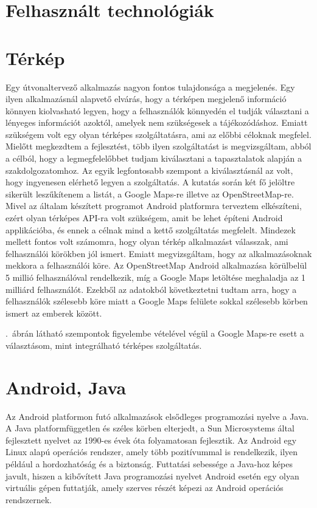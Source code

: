 	

\section{Felhasznált technológiák}
\label{felhaszntech}
\section*{Térkép}
Egy útvonaltervező alkalmazás nagyon fontos tulajdonsága a megjelenés. 
Egy ilyen alkalmazásnál alapvető elvárás, hogy a térképen megjelenő információ könnyen kiolvasható legyen, hogy a felhasználók könnyedén el tudják választani a lényeges információt azoktól, amelyek nem szükségesek a tájékozódáshoz. 
Emiatt szükségem volt egy olyan térképes szolgáltatásra, ami az előbbi céloknak megfelel. 
Mielőtt megkezdtem a fejlesztést, több ilyen szolgáltatást is megvizsgáltam, abból a célból, hogy a legmegfelelőbbet tudjam kiválasztani a tapasztalatok alapján a szakdolgozatomhoz. 
Az egyik legfontosabb szempont a kiválasztásnál az volt, hogy ingyenesen elérhető legyen a szolgáltatás. 
A kutatás során két fő jelöltre sikerült leszűkítenem a listát, a Google Maps-re illetve az OpenStreetMap-re. 
Mivel az általam készített programot Android platformra terveztem elkészíteni, ezért olyan térképes API-ra volt szükségem, amit be lehet építeni Android applikációba, és ennek a célnak mind a kettő szolgáltatás megfelelt. 
Mindezek mellett fontos volt számomra, hogy olyan térkép alkalmazást válasszak, ami felhasználói körökben jól ismert. 
Emiatt megvizsgáltam, hogy az alkalmazásoknak mekkora a felhasználói köre. 
Az OpenStreetMap Android alkalmazása körülbelül 5 millió  felhasználóval rendelkezik, míg a Google Maps letöltése meghaladja az 1 milliárd felhasználót. 
Ezekből az adatokból következtetni tudtam arra, hogy a felhasználók szélesebb köre miatt a Google Maps felülete sokkal szélesebb körben ismert az emberek között.


.\ ábrán látható szempontok figyelembe vételével végül a Google Maps-re esett a választásom, mint integrálható térképes szolgáltatás.

\section*{Android, Java}
Az Android platformon\cite{androidprogramming} futó alkalmazások elsődleges programozási nyelve a Java.
A Java platformfüggetlen és széles körben elterjedt, a Sun Microsystems által fejlesztett nyelvet az 1990-es évek óta folyamatosan fejlesztik.
Az Android egy Linux alapú operációs rendszer, amely több pozitívummal is rendelkezik, ilyen például a hordozhatóság és a biztonság.
Futtatási sebessége a Java-hoz képes javult, hiszen a kibővített Java programozási nyelvet Android esetén egy olyan virtuális gépen futtatják, amely szerves részét képezi az Android operációs rendszernek. 

